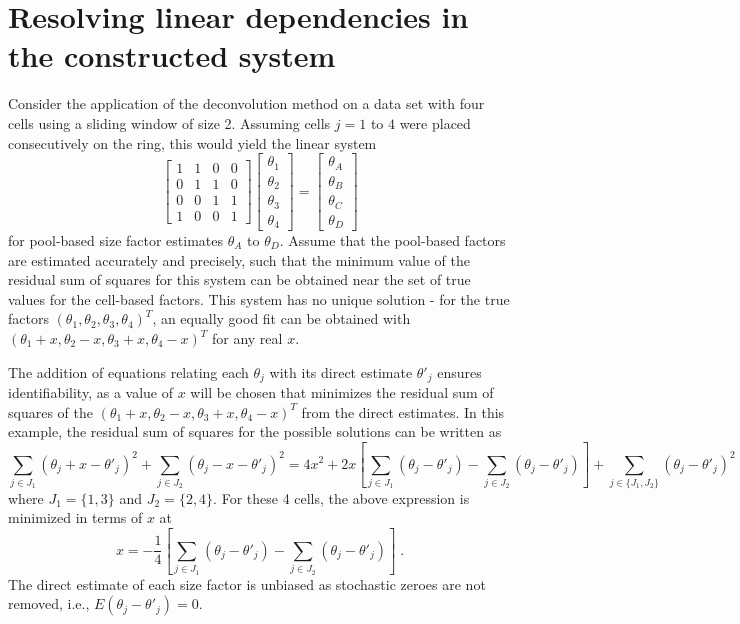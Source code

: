 \documentclass{article}
\begin{document}
\section{Resolving linear dependencies in the constructed system}
Consider the application of the deconvolution method on a data set with four cells using a sliding window of size 2.
Assuming cells $j=1$ to $4$ were placed consecutively on the ring, this would yield the linear system
\[
\begin{bmatrix}
1 & 1 & 0 & 0 \\
0 & 1 & 1 & 0 \\
0 & 0 & 1 & 1 \\
1 & 0 & 0 & 1 
\end{bmatrix}
\begin{bmatrix}
\theta_1 \\
\theta_2 \\
\theta_3 \\
\theta_4 
\end{bmatrix}
=
\begin{bmatrix}
\theta_A \\
\theta_B \\
\theta_C \\
\theta_D 
\end{bmatrix}
\]
for pool-based size factor estimates $\theta_A$ to $\theta_D$. 
Assume that the pool-based factors are estimated accurately and precisely, such that the minimum value of the residual sum of squares for this system can be obtained near the set of true values for the cell-based factors.
This system has no unique solution - for the true factors $(\theta_1, \theta_2, \theta_3, \theta_4)^T$, 
    an equally good fit can be obtained with $(\theta_1+x, \theta_2-x, \theta_3+x, \theta_4 - x)^T$ for any real $x$.

The addition of equations relating each $\theta_j$ with its direct estimate $\theta'_j$ ensures identifiability, 
    as a value of $x$ will be chosen that minimizes the residual sum of squares of the $(\theta_1+x, \theta_2-x, \theta_3+x, \theta_4 - x)^T$ from the direct estimates.
In this example, the residual sum of squares for the possible solutions can be written as
\[
\sum_{j \in J_1} (\theta_j +x - \theta'_j)^2+ \sum_{j \in J_2} (\theta_j -x - \theta'_j)^2 
= 4 x^2 + 2x\left[ \sum_{j \in J_1} (\theta_j - \theta'_j) - \sum_{j \in J_2} (\theta_j - \theta'_j)\right] + \sum_{j \in \{J_1, J_2\}} (\theta_j - \theta'_j)^2
\]
where $J_1 = \{1, 3\}$ and $J_2=\{2, 4\}$.
For these 4 cells, the above expression is minimized in terms of $x$ at
\[
x = - \frac{1}{4}\left[ \sum_{j \in J_1} (\theta_j - \theta'_j) - \sum_{j \in J_2} (\theta_j - \theta'_j)\right] \;.
\]
The direct estimate of each size factor is unbiased as stochastic zeroes are not removed, i.e., $E(\theta_j - \theta'_j)=0$.
\end{document}
